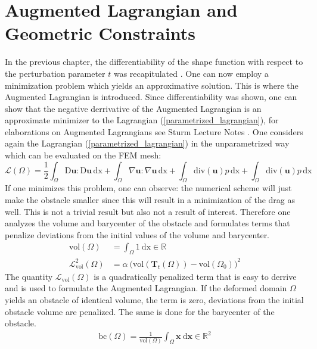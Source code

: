\section{Augmented Lagrangian and Geometric Constraints}

In the previous chapter, the differentiability of the shape function with respect to the perturbation 
parameter $t$ was recapitulated \cite{nearly_conformal_paper}. One can now employ a minimization problem
which yields an approximative solution. This is where the Augmented Lagrangian is introduced. Since differentiability was shown,
one can show that the negative derrivative of the Augmented Lagrangian is an approximate minimizer to the 
Lagrangian (\ref{parametrized_lagrangian}), for elaborations on Augmented Lagrangians see Sturm Lecture Notes \cite{lecture_notes_sturm}. 
One considers again the Lagrangian (\ref{parametrized_lagrangian}) in the unparametrized way which can be evaluated on the FEM mesh:
\begin{equation}\label{basic_lagrangian}
    \mathcal{L}(\Omega) = \frac{1}{2} \int_{\Omega} \mathrm{D}\mathbf{u}: \mathrm{D} \mathbf{u} \, \mathrm{dx} + 
	\int_{\Omega} \nabla \mathbf{u} : \nabla \mathbf{u} \, \mathrm{dx} + \int_{\Omega} \mathrm{div}(\mathbf{u})p \, \mathrm{dx} +
	 \int_{\Omega} \mathrm{div}(\mathbf{u})p \, \mathrm{dx}
\end{equation}
If one minimizes this problem, one can observe: the numerical scheme will just make the obstacle smaller since this will 
result in a minimization of the drag as well. This is not a trivial result but also not a result of interest. Therefore one analyzes the 
volume and barycenter of the obstacle and formulates terms that penalize deviations from the initial values of the volume and barycenter.
\begin{align}
    \mathrm{vol}(\Omega) &= \int_{\Omega} 1 \ \mathrm{dx} \in \mathbb{R} \label{vol_equation}\\
    \mathcal{L}^2_{\mathrm{vol}}(\Omega) &= \alpha \ \Big( \mathrm{vol}( \mathbf{T}_{t}(\Omega) )-\mathrm{vol}(\Omega_0) \Big) ^2
\end{align}
The quantity $\mathcal{L}_{\mathrm{vol}}(\Omega)$ is a quadratically penalized term that is easy to derrive and is used to formulate 
the Augmented Lagrangian. If the deformed domain $\Omega$ yields an obstacle of identical volume, the term is zero, deviations 
from the initial obstacle volume are penalized. The same is done for the barycenter of the obstacle. 
\begin{align}
    \mathrm{bc}(\Omega) =
    \frac{1}{\mathrm{vol}(\Omega)}\int_{\Omega} \mathbf{x} \ \mathrm{d} \mathbf{x} \in \mathbb{R}^2
\end{align}
